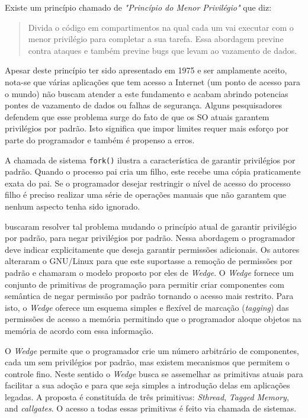 Existe um princípio chamado de \emph{"Princípio do Menor Privilégio"} que diz:

\begin{quote}
Divida o código em compartimentos na qual cada um vai executar com o menor
privilégio para completar a sua tarefa. Essa abordagem previne contra ataques
e também previne bugs que levam ao vazamento de dados.
\citep{protectionprinciple}
\end{quote}

Apesar deste princípio ter sido apresentado em 1975 e ser amplamente aceito,
nota-se que várias aplicações que tem acesso a Internet (um ponto de acesso
para o mundo) não buscam atender a este fundamento e acabam abrindo
potencias pontes de vazamento de dados ou falhas de segurança. Alguns
pesquisadores defendem que esse problema surge do fato de que os SO atuais
garantem privilégios por padrão. Isto significa que impor limites requer mais
esforço por parte do programador e também é propenso a erros.

A chamada de sistema \texttt{fork()} ilustra a característica de garantir
privilégios por padrão. Quando o processo pai cria um filho, este recebe uma
cópia praticamente exata do pai. Se o programador desejar restringir o nível de
acesso do processo filho é preciso realizar uma série de operações manuais que
não garantem que nenhum aspecto tenha sido ignorado.

\cite{wedge} buscaram resolver tal problema mudando o princípio atual de
garantir privilégio por padrão, para negar privilégios por padrão. Nessa
abordagem o programador deve indicar explicitamente que deseja garantir
permissões adicionais. Os autores alteraram o GNU/Linux para que este
suportasse a remoção de permissões por padrão e chamaram o modelo proposto por
eles de \emph{Wedge}. O \emph{Wedge} fornece um conjunto de primitivas de
programação para permitir criar componentes com semântica de negar permissão
por padrão tornando o acesso mais restrito. Para isto, o \emph{Wedge} oferece
um esquema simples e flexível de marcação (\emph{tagging}) das permissões de
acesso a memória permitindo que o programador aloque objetos na memória de
acordo com essa informação.

O \emph{Wedge} permite que o programador crie um número arbitrário de
componentes, cada um sem privilégios por padrão, mas existem mecanismos que
permitem o controle fino. Neste sentido o \emph{Wedge} busca se assemelhar as
primitivas atuais para facilitar a sua adoção e para que seja simples a
introdução delas em aplicações legadas. A proposta é constituída de três
primitivas: \emph{Sthread}, \emph{Tagged Memory}, and \emph{callgates}. O
acesso a todas essas primitivas é feito via chamada de sistemas.

